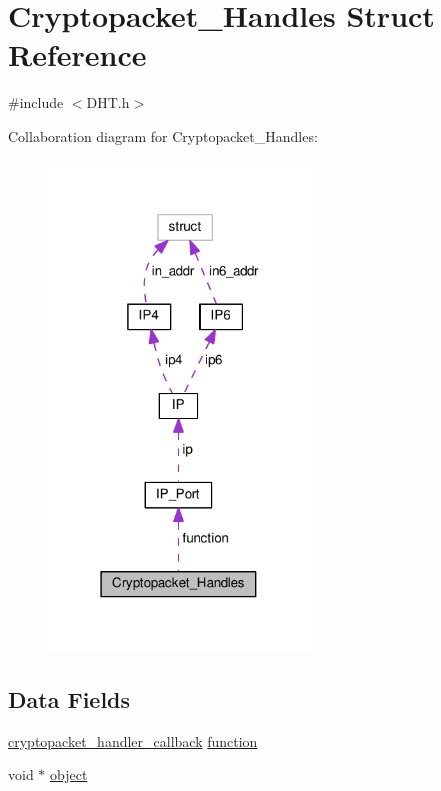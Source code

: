 \hypertarget{struct_cryptopacket___handles}{\section{Cryptopacket\+\_\+\+Handles Struct Reference}
\label{struct_cryptopacket___handles}
}


{\ttfamily \#include $<$D\+H\+T.\+h$>$}



Collaboration diagram for Cryptopacket\+\_\+\+Handles\+:
\nopagebreak
\begin{figure}[H]
\begin{center}
\leavevmode
\includegraphics[width=198pt]{d3/d3b/struct_cryptopacket___handles__coll__graph}
\end{center}
\end{figure}
\subsection*{Data Fields}
\begin{DoxyCompactItemize}
\item 
\hyperlink{_d_h_t_8h_abf840e82128d3aee3c9fc5ff51e83a14}{cryptopacket\+\_\+handler\+\_\+callback} \hyperlink{struct_cryptopacket___handles_a9313784040f9666743d9aff915543903}{function}
\item 
void $\ast$ \hyperlink{struct_cryptopacket___handles_a077376d12464f945e2414d5499c79b3f}{object}
\end{DoxyCompactItemize}


